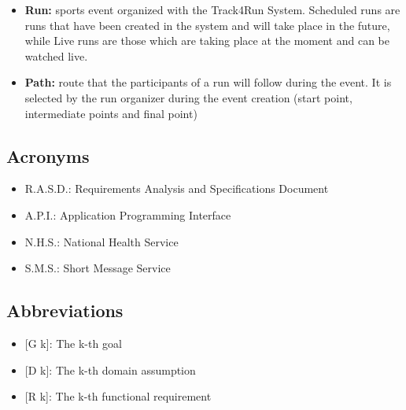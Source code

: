 \begin{itemize}
\item\textbf{Run:} sports event organized with the Track4Run System. Scheduled runs are runs that have been created in the system and will take place in the future, while Live runs are those which are taking place at the moment and can be watched live. 

\item\textbf{Path:} route that the participants of a run will follow during the event. It is selected by the run organizer during the event creation (start point, intermediate points and final point)
\end{itemize}

\subsection{Acronyms}

\begin{itemize}
  \item R.A.S.D.: Requirements Analysis and Specifications Document
  \item A.P.I.: Application Programming Interface 
  \item N.H.S.: National Health Service
  \item S.M.S.: Short Message Service
\end{itemize}

\subsection{Abbreviations}

\begin{itemize}
	\item {[}G k{]}: The k-th goal
    \item {[}D k{]}: The k-th domain assumption
    \item {[}R k{]}: The k-th functional requirement
\end{itemize}
